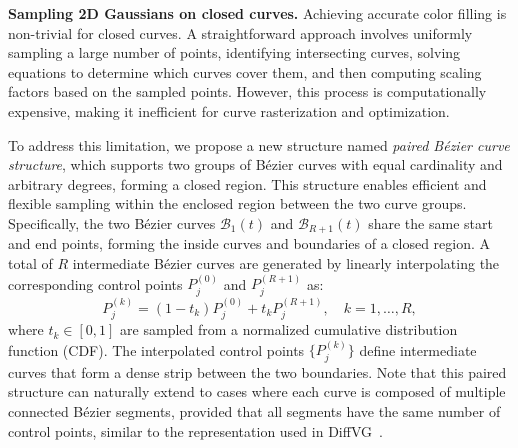 \noindent\textbf{Sampling 2D Gaussians on closed curves.} Achieving accurate color filling is non-trivial for closed curves. A straightforward approach involves uniformly sampling a large number of points, identifying intersecting curves, solving equations to determine which curves cover them, and then computing scaling factors based on the sampled points. However, this process is computationally expensive, making it inefficient for curve rasterization and optimization.


To address this limitation, we propose a new structure named \emph{paired Bézier curve structure}, which supports two groups of Bézier curves with equal cardinality and arbitrary degrees, forming a closed region. This structure enables efficient and flexible sampling within the enclosed region between the two curve groups. Specifically, the two Bézier curves \( \mathcal{B}_1(t) \) and \( \mathcal{B}_{R+1}(t) \) share the same start and end points, forming the inside curves and boundaries of a closed region. A total of \( R \) intermediate Bézier curves are generated by linearly interpolating the corresponding control points \( P^{(0)}_j \) and \( P^{(R+1)}_j \) as:
\begin{equation}
P^{(k)}_j = (1 - t_k) P^{(0)}_j + t_k P^{(R+1)}_j, \quad k = 1, \dots, R,
\end{equation}
where \( t_k \in [0,1] \) are sampled from a normalized cumulative distribution function (CDF). The interpolated control points \( \{ P^{(k)}_j \} \) define intermediate curves that form a dense strip between the two boundaries. Note that this paired structure can naturally extend to cases where each curve is composed of multiple connected Bézier segments, provided that all segments have the same number of control points, similar to the representation used in DiffVG~\cite{Li:2020:DVG}.

